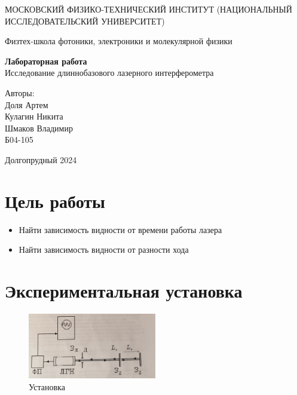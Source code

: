 \documentclass{article}
\begin{document}
\begin{titlepage}
	\begin{center}
		{\large МОСКОВСКИЙ ФИЗИКО-ТЕХНИЧЕСКИЙ ИНСТИТУТ (НАЦИОНАЛЬНЫЙ ИССЛЕДОВАТЕЛЬСКИЙ УНИВЕРСИТЕТ)}
	\end{center}
	\begin{center}
		{\large Физтех-школа фотоники, электроники и молекулярной физики}
	\end{center}


	\vspace{4.5cm}
	{\huge
		\begin{center}
			{\bf Лабораторная работа }\\
			Исследование длиннобазового лазерного интерферометра
		\end{center}
	}
	\vspace{2cm}
	\begin{flushright}
		{\LARGE Авторы:\\
			Доля Артем\\
			Кулагин Никита\\
			Шмаков Владимир \\
			\vspace{0.2cm}
			Б04-105}
	\end{flushright}
	\vspace{8cm}
	\begin{center}
		Долгопрудный 2024
	\end{center}
\end{titlepage}


\newpage
\section{Цель работы}
\begin{itemize}
	\item Найти зависимость видности от времени работы лазера
	\item Найти зависимость видности от разности хода
\end{itemize}
\section{Экспериментальная установка}
\begin{figure}[htp]
	\centering
	\includegraphics[width=0.5\textwidth]{megahuinya.jpg}
	\caption{Установка}
	\label{pic:experimental_setup}
\end{figure}
\end{document}
